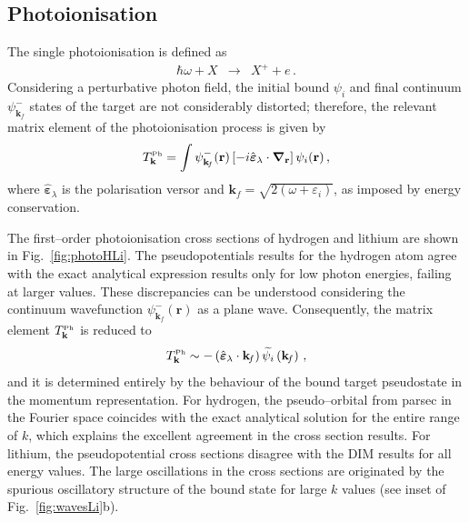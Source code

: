 \documentclass[10pt]{article}
\begin{document}
\subsection{Photoionisation}
\label{sec:photoatom}

The single photoionisation is defined as
\begin{eqnarray}
 \hbar\omega + X &\rightarrow& X^+ + e\,.
\end{eqnarray}
Considering a perturbative photon field, the initial bound $\psi_{i}$ 
and final continuum $\psi_{\mathbf{k}_{\!f}}^-$ states of the target are
not considerably distorted; therefore, the relevant matrix element of the 
photoionisation process is given by
\begin{equation}
 T_{\mathbf{k}}^{\mbox{\tiny Ph}} = \int{
 \psi_{\mathbf{k}_{\!f}}^-(\mathbf{r}) 
 \left[-i \hat{\boldsymbol{\varepsilon}}_\lambda \cdot 
 \boldsymbol{\nabla}_\mathbf{r}\right] 
 \psi_{i}(\mathbf{r})}\,,
\end{equation}
where $\hat{\boldsymbol{\varepsilon}}_\lambda$ is the polarisation 
versor and $\mathbf{k}_{\!f}=\sqrt{2(\omega+\varepsilon_i)}$, as imposed 
by energy conservation.

The first--order photoionisation cross sections of hydrogen and 
lithium are shown in Fig.~\ref{fig:photoHLi}. The pseudopotentials 
results for the hydrogen atom agree with the exact analytical 
expression results only for low photon energies, failing at larger values. 
These discrepancies can be understood considering the continuum 
wavefunction $\psi_{\mathbf{k}_{\!f}}^-(\mathbf{r})$ as a plane wave. 
Consequently, the matrix element $T_{\mathbf{k}}^{\mbox{\tiny Ph}}$ 
is reduced to
\begin{equation}
 T_{\mathbf{k}}^{\mbox{\tiny Ph}} \sim 
 -\left(\hat{\boldsymbol{\varepsilon}}_\lambda \cdot \mathbf{k}_{\!f} \right)
 \widetilde{\psi_i} \left(\mathbf{k}_{\!f}\right)\,,
\end{equation}
and it is determined entirely by the behaviour of the bound target 
pseudostate in the momentum representation. For hydrogen, the 
pseudo--orbital from {\sc parsec} in the Fourier space coincides with 
the exact 
analytical solution for the entire range of $k$, which explains the 
excellent agreement in the cross section results.
For lithium, the pseudopotential cross sections disagree with the DIM 
results for all energy values. The large oscillations in the cross sections
are originated by the spurious oscillatory structure of the bound state
for large  $k$ values (see inset of Fig.~\ref{fig:wavesLi}b).
\end{document}
